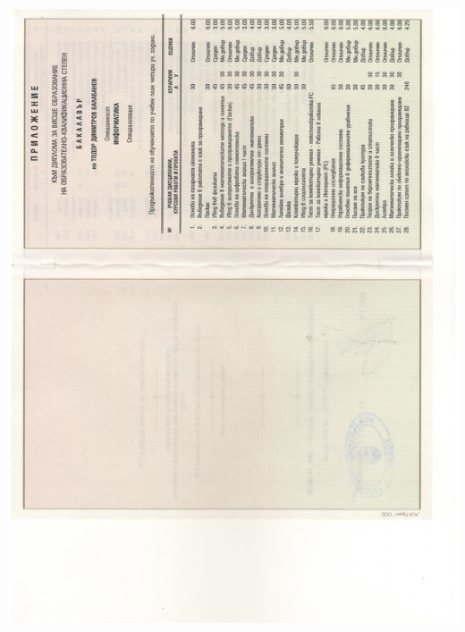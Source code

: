 \documentclass[bulgarian,a4paper]{europasscv}
\begin{document}
\includegraphics[width=\textwidth,height=\textheight,keepaspectratio]{DiplomaNBU2006_3}
\end{document}
